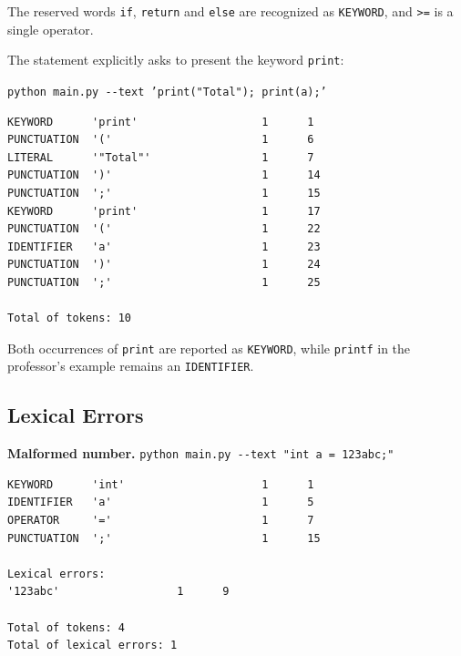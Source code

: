 \documentclass[11pt,letterpaper]{article}
\newcommand{\tok}[1]{\texttt{#1}}
\begin{document}
The reserved words \texttt{if}, \texttt{return} and \texttt{else} are
recognized as \tok{KEYWORD}, and \tok{>=} is a single operator.

The statement explicitly asks to present the keyword \tok{print}:

\par\noindent\begin{minipage}{\linewidth}
\tok{python main.py -{}-text 'print("Total"); print(a);'}\par\smallskip
\begin{lstlisting}[style=console]
KEYWORD      'print'                   1      1
PUNCTUATION  '('                       1      6
LITERAL      '"Total"'                 1      7
PUNCTUATION  ')'                       1      14
PUNCTUATION  ';'                       1      15
KEYWORD      'print'                   1      17
PUNCTUATION  '('                       1      22
IDENTIFIER   'a'                       1      23
PUNCTUATION  ')'                       1      24
PUNCTUATION  ';'                       1      25

Total of tokens: 10
\end{lstlisting}
\end{minipage}\par\smallskip

Both occurrences of \tok{print} are reported as \tok{KEYWORD}, while
\tok{printf} in the professor's example remains an \tok{IDENTIFIER}.

\subsection{Lexical Errors}

\par\noindent\begin{minipage}{\linewidth}
\textbf{Malformed number.} \tok{python main.py -{}-text "int a = 123abc;"}\par\smallskip
\begin{lstlisting}[style=console]
KEYWORD      'int'                     1      1
IDENTIFIER   'a'                       1      5
OPERATOR     '='                       1      7
PUNCTUATION  ';'                       1      15

Lexical errors:
'123abc'                  1      9

Total of tokens: 4
Total of lexical errors: 1
\end{lstlisting}
\end{minipage}\par\smallskip
\end{document}
